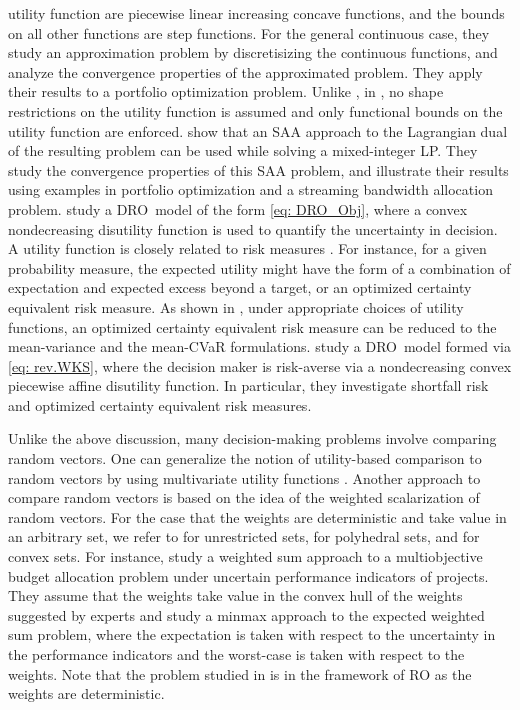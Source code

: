 \documentclass[final,onefignum,onetabnum]{class}
\newcommand{\dro}{DRO}
\begin{document}
utility function are piecewise linear increasing concave functions, and the bounds on all other functions are step functions.
For the general continuous case, they study an approximation problem by discretisizing the continuous functions, and analyze the convergence properties of the approximated problem. They apply  their results to  a portfolio optimization problem. Unlike \citet{hu2015}, in \citet{hu2018}, no shape restrictions on the utility function is assumed  and only functional bounds on the utility function are enforced.
\citet{hu2018} show that an SAA approach to the Lagrangian dual of the resulting problem can be used while solving a  mixed-integer LP. They  study the convergence properties of this SAA problem, and illustrate  their results using examples in portfolio optimization and a streaming bandwidth allocation problem. 
\citet{bertsimas2010minmax} study a \dro\ model of the form  \eqref{eq: DRO_Obj}, where a convex nondecreasing disutility function is used  to quantify the uncertainty in decision. A utility function is closely related to risk measures \cite{hu2015utility}. For instance, for a given probability measure, the expected utility might have the form of a combination of expectation and expected excess beyond a target, or an optimized certainty equivalent risk measure. 
As shown in \citet{bental2007OCE}, under appropriate choices of utility functions,  an optimized certainty equivalent risk measure can be reduced to the mean-variance and the mean-CVaR formulations. 
 \citet{wiesemann2014}  study a \dro\ model formed via \eqref{eq: rev.WKS}, where the  decision maker is risk-averse via a nondecreasing convex piecewise affine disutility function. In particular, they investigate shortfall risk and optimized certainty equivalent risk measures. 


Unlike the above discussion, many decision-making problems involve comparing random vectors. One can  generalize the notion of utility-based comparison to random vectors by using multivariate utility functions \cite{armbruster2015}. %
Another approach to compare random vectors is based on the idea of the weighted scalarization of random vectors. For the case that the weights are deterministic and take value in an arbitrary set, we refer to \citet{dentcheva2009} for unrestricted sets, \citet{homemdemello2009,hu2011budget,hu2012MO} for polyhedral sets, and \citet{hu2012SAA} for convex sets. For instance,  \citet{hu2011budget} study a  weighted sum approach to a multiobjective budget allocation problem under uncertain performance indicators of projects. They assume that the weights take value in the convex hull of the weights suggested by experts and study a minmax approach to the expected  weighted sum problem, where the expectation is taken with respect to the uncertainty in the performance indicators and  the worst-case is taken with respect to the weights.  Note that the problem studied in \citet{hu2011budget} is in the framework of RO as the weights are deterministic. 
\end{document}
